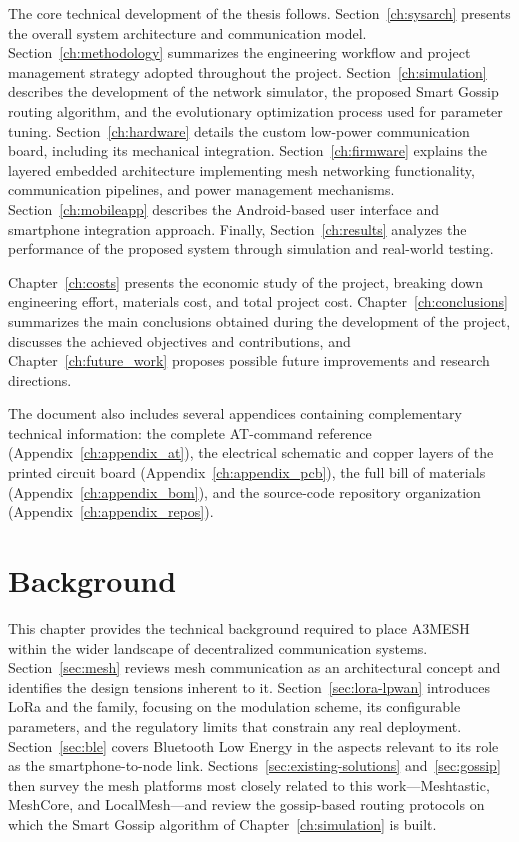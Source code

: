 \documentclass[english,bachelor]{tfgitic}[2026/01/22]
\begin{document}
The core technical development of the thesis follows. Section~\ref{ch:sysarch} presents the overall system architecture and communication model. Section~\ref{ch:methodology} summarizes the engineering workflow and project management strategy adopted throughout the project. Section~\ref{ch:simulation} describes the development of the network simulator, the proposed Smart Gossip routing algorithm, and the evolutionary optimization process used for parameter tuning. Section~\ref{ch:hardware} details the custom low-power communication board, including its mechanical integration. Section~\ref{ch:firmware} explains the layered embedded architecture implementing mesh networking functionality, communication pipelines, and power management mechanisms. Section~\ref{ch:mobileapp} describes the Android-based user interface and smartphone integration approach. Finally, Section~\ref{ch:results} analyzes the performance of the proposed system through simulation and real-world testing.

Chapter~\ref{ch:costs} presents the economic study of the project, breaking down engineering effort, materials cost, and total project cost. Chapter~\ref{ch:conclusions} summarizes the main conclusions obtained during the development of the project, discusses the achieved objectives and contributions, and Chapter~\ref{ch:future_work} proposes possible future improvements and research directions.

The document also includes several appendices containing complementary technical information: the complete AT-command reference (Appendix~\ref{ch:appendix_at}), the electrical schematic and copper layers of the printed circuit board (Appendix~\ref{ch:appendix_pcb}), the full bill of materials (Appendix~\ref{ch:appendix_bom}), and the source-code repository organization (Appendix~\ref{ch:appendix_repos}).



\chapter{Background}
\label{ch:background}

This chapter provides the technical background required to place A3MESH within the wider landscape of decentralized communication systems. Section~\ref{sec:mesh} reviews mesh communication as an architectural concept and identifies the design tensions inherent to it. Section~\ref{sec:lora-lpwan} introduces LoRa and the  family, focusing on the modulation scheme, its configurable parameters, and the regulatory limits that constrain any real deployment. Section~\ref{sec:ble} covers Bluetooth Low Energy in the aspects relevant to its role as the smartphone-to-node link. Sections~\ref{sec:existing-solutions} and~\ref{sec:gossip} then survey the mesh platforms most closely related to this work---Meshtastic, MeshCore, and LocalMesh---and review the gossip-based routing protocols on which the Smart Gossip algorithm of Chapter~\ref{ch:simulation} is built.
\end{document}
